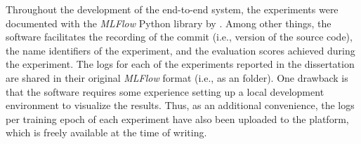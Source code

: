 
Throughout the development of the end-to-end system, the
experiments were documented with the \emph{MLFlow} Python
library by \textcite{zaharia2018accelerating}. Among other
things, the software facilitates the recording of the
 commit (i.e., version of the source code), the
name identifiers of the experiment, and the evaluation
scores achieved during the experiment. The logs for each of
the experiments reported in the dissertation are shared in
their original \emph{MLFlow} format (i.e., as an
 folder). One drawback is that the software
requires some experience setting up a local development
environment to visualize the results. Thus, as an additional
convenience, the logs per training epoch of each experiment
have also been uploaded to the
platform, which is
freely available at the time of writing.
